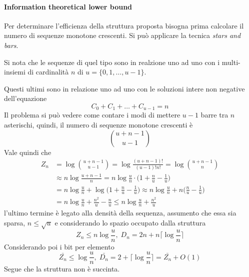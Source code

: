 \paragraph{Information theoretical lower bound}
Per determinare l'efficienza della struttura proposta bisogna prima calcolare 
il numero di sequenze monotone crescenti.
Si può applicare la tecnica \emph{stars and bars}.

Si nota che le sequenze di quel tipo sono in realzione uno ad uno 
con i multi-insiemi di cardinalità $n$ di $u = \{0,1,\dots, u-1\}$.

Questi ultimi sono in relazione uno ad uno con le soluzioni intere non negative
dell'equazione 
$$C_0 + C_1 + \dots + C_{u-1} = n$$
Il problema si può vedere come contare i modi di mettere $u-1$ barre tra $n$ asterischi, 
quindi, il numero di sequenze monotone crescenti è
$$\binom{u + n-1}{u-1}$$
Vale quindi che 
\begin{equation}
    \begin{aligned}
        Z_n &= \log \binom{u + n-1}{u-1} = \log \frac{(u+n-1)!}{(u-1)! n!} = \log \binom
        {u+n-1}{n} \\
        &\approx n\log\frac{u+n-1}{n} = n\log\frac{u}{n}\cdot\bigg(1 + \frac{n}{u} - \frac{1}{u}\bigg)
        \\&= n\log\frac{u}{n} + \log \bigg(1 + \frac{n}{u} - \frac{1}{u}\bigg) \approx
        n\log\frac{u}{n} + n \bigg(\frac{n}{u} - \frac{1}{u}\bigg)\\
        &= n \log \frac{u}{n} + \frac{n^2}{u} - \frac{n}{u} \leq n\log\frac{u}{n} + \frac{n^2}{u}
    \end{aligned}
\end{equation}
l'ultimo termine è legato alla densità della sequenza, assumento che essa sia sparsa, 
$n \leq \sqrt{u}$ e considerando lo spazio occupato dalla struttura
$$Z_n \leq n\log\frac{u}{n},\; D_n = 2n + n\bigg\lceil \log \frac{u}{n}\bigg\rceil$$
Considerando poi i bit per elemento
$$\bar{Z_n} \leq \log\frac{u}{n}, \; \bar{D_n} = 2 + \bigg\lceil \log \frac{u}{n}\bigg\rceil 
= \bar{Z_n} + O(1)$$
Segue che la struttura non è succinta.
